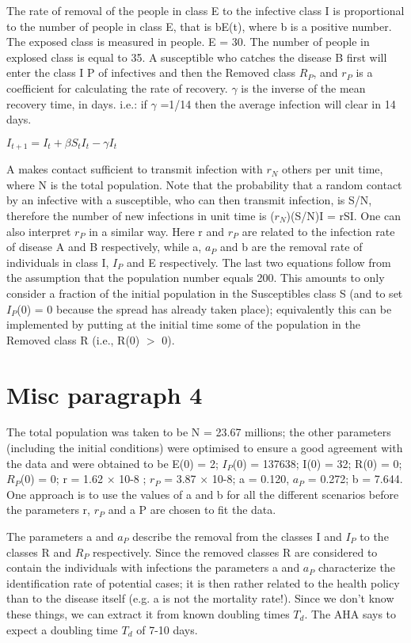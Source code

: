 \documentclass{bmcart}
\begin{document}
The rate of removal of the people in class E to the infective class I is proportional to the number of people in class E, that is bE(t), where b is a positive number. The exposed class is measured in people. E = 30. The number of people in explosed class is equal to 35. A susceptible who catches
the disease B first will enter the class I P of infectives and
then the Removed class $R_{P}$, and $r_{P}$ is a coefficient for calculating the rate of recovery. $\gamma$ is the inverse of the mean recovery time, in days. i.e.: if $\gamma$ =1/14 then the average infection will clear in 14 days.

\begin{math}
I_{t+1} = I_t + \beta S_t I_t - \gamma I_t
\end{math}

A makes contact sufficient to transmit infection with $r_{N}$ others per unit time, where N is the total population. Note that the probability that a random contact by an infective with a susceptible, who can then transmit infection, is S/N, therefore the number of new infections in unit time is ($r_{N}$)(S/N)I = rSI. One can also interpret $r_{P}$ in a similar way. Here r and $r_{P}$ are related to the infection rate of disease A and B respectively, while a, $a_{P}$ and b are the removal rate of individuals in class I, $I_{P}$ and E respectively. The last two equations  follow  from  the  assumption  that  the  population number equals 200. This amounts to only consider a fraction of the initial population in the Susceptibles class S (and to set $I_{P}$(0) = 0 because the spread has already  taken  place);  equivalently  this  can  be  implemented by putting at the initial time some of the population in the Removed class R (i.e., R(0) $>$ 0).


\section{Misc paragraph 4}

The total
population was taken to be N = 23.67 millions; the other parameters (including the initial conditions) were optimised to ensure a good agreement with the data and were obtained to be E(0) = 2; $I_{P}$(0) = 137638; I(0) = 32;
R(0) = 0; $R_{P}$(0) = 0; r = 1.62 × 10-8 ; $r_{P}$ = 3.87 × 10-8; a = 0.120, $a_{P}$ = 0.272; b = 7.644. One approach is to use the values of a and b for all the different scenarios before the
parameters r, $r_{P}$ and a P are chosen to fit the data.


The parameters a and $a_{P}$ describe the removal from the classes I and $I_{P}$ to the classes R and $R_{P}$ respectively. Since the removed classes R are considered to contain the individuals with infections the parameters a and $a_{P}$ characterize the identification rate of potential cases; it is then rather related to the health policy than to the disease itself (e.g. a is not the mortality rate!). Since we don't know these
things, we can extract it from known doubling times $T_{d}$. The AHA says to expect a doubling time
$T_{d}$ of 7-10 days.
\end{document}
